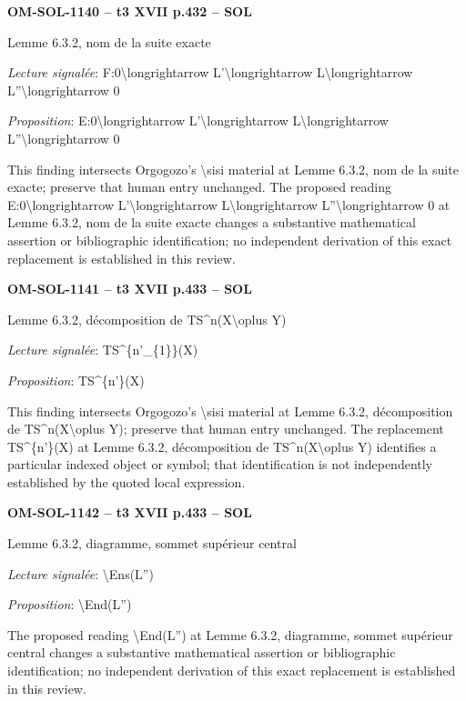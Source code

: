 \par\noindent\textbf{OM-SOL-1140 -- t3 XVII p.432 -- SOL}\par
Lemme 6.3.2, nom de la suite exacte\par
\emph{Lecture signalée}: F:0\textbackslash{}longrightarrow L'\textbackslash{}longrightarrow L\textbackslash{}longrightarrow L''\textbackslash{}longrightarrow 0\par
\emph{Proposition}: E:0\textbackslash{}longrightarrow L'\textbackslash{}longrightarrow L\textbackslash{}longrightarrow L''\textbackslash{}longrightarrow 0\par
This finding intersects Orgogozo's \textbackslash{}sisi material at Lemme 6.3.2, nom de la suite exacte; preserve that human entry unchanged. The proposed reading E:0\textbackslash{}longrightarrow L'\textbackslash{}longrightarrow L\textbackslash{}longrightarrow L''\textbackslash{}longrightarrow 0 at Lemme 6.3.2, nom de la suite exacte changes a substantive mathematical assertion or bibliographic identification; no independent derivation of this exact replacement is established in this review.\par
\par\noindent\textbf{OM-SOL-1141 -- t3 XVII p.433 -- SOL}\par
Lemme 6.3.2, décomposition de TS\textasciicircum{}n(X\textbackslash{}oplus Y)\par
\emph{Lecture signalée}: TS\textasciicircum{}\{n'\_\{1\}\}(X)\par
\emph{Proposition}: TS\textasciicircum{}\{n'\}(X)\par
This finding intersects Orgogozo's \textbackslash{}sisi material at Lemme 6.3.2, décomposition de TS\textasciicircum{}n(X\textbackslash{}oplus Y); preserve that human entry unchanged. The replacement TS\textasciicircum{}\{n'\}(X) at Lemme 6.3.2, décomposition de TS\textasciicircum{}n(X\textbackslash{}oplus Y) identifies a particular indexed object or symbol; that identification is not independently established by the quoted local expression.\par
\par\noindent\textbf{OM-SOL-1142 -- t3 XVII p.433 -- SOL}\par
Lemme 6.3.2, diagramme, sommet supérieur central\par
\emph{Lecture signalée}: \textbackslash{}Ens(L'')\par
\emph{Proposition}: \textbackslash{}End(L'')\par
The proposed reading \textbackslash{}End(L'') at Lemme 6.3.2, diagramme, sommet supérieur central changes a substantive mathematical assertion or bibliographic identification; no independent derivation of this exact replacement is established in this review.\par
